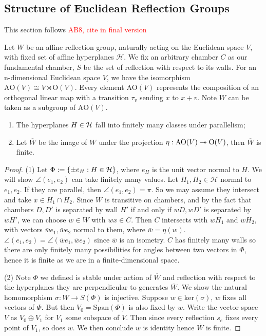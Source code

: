 \documentclass[../main.tex]{subfiles}
\begin{document}
\subsection{Structure of Euclidean Reflection Groups}

This section follows \textcolor{red}{AB8, cite in final version}

Let $W$ be an affine reflection group, naturally acting on the Euclidean space $V$, with fixed set of affine hyperplanes $\mathcal H$. We fix an arbitrary chamber $C$ as our fundamental chamber, $S$ be the set of reflection with respect to its walls. For an n-dimensional Euclidean space $V$, we have the isomorphism $\text{AO}(V) \cong V \rtimes \text{O}(V)$. Every element $\text{AO}(V)$ represents the composition of an orthogonal linear map with a transition $\tau_v$ sending $x$ to $x+v$. Note $W$ can be taken as a subgroup of $\text{AO}(V)$.

\begin{theorem}\label{thm:finpara}
    \begin{enumerate}
        \item The hyperplanes $H\in \mathcal{H}$ fall into finitely many classes under parallelism;
        \item Let $\overline W$ be the image of $W$ under the projection $\eta: \text{AO}(V) \twoheadrightarrow \text O (V)$, then $\overline W$ is finite.
    \end{enumerate}
\end{theorem}

\begin{proof}
    (1) Let $\Phi := \{\pm e_H:H\in \mathcal{H}\}$, where $e_H$ is the unit vector normal to $H$. We will show $\angle(e_1,e_2)$ can take finitely many values. Let $H_1,H_2 \in \mathcal H$ normal to $e_1,e_2$. If they are parallel, then $\angle(e_1,e_2)=\pi$. So we may assume they intersect and take $x\in H_1\cap H_2$. Since $W$ is transitive on chambers, and by the fact that chambers $D,D'$ is separated by wall $H'$ if and only if $wD,wD'$ is separated by $wH'$, we can choose $w \in W$ with $wx\in \overline C$. Then $\overline C$ intersects with $wH_1$ and $wH_2$, with vectors $\bar we_1,\bar we_2$ normal to them, where $\bar w=\eta(w)$. $\angle(e_1,e_2)=\angle(\bar we_1,\bar we_2)$ since $\bar w$ is an isometry. $C$ has finitely many walls so there are only finitely many possibilities for angles between two vectors in $\Phi$, hence it is finite as we are in a finite-dimensional space.

    (2) Note $\Phi$ we defined is stable under action of $\overline W$ and reflection with respect to the hyperplanes they are perpendicular to generates $\overline W$. We show the natural homomorphism $\sigma:W \rightarrow S(\Phi)$ is injective. Suppose $w\in \text{ker}(\sigma)$, $w$ fixes all vectors of $\Phi$. But then $V_0=\text{Span}(\Phi)$ is also fixed by $w$. Write the vector space $V$ as $V_0\oplus V_1$ for $V_1$ some subspace of $V$. Then since every reflection $s_e$ fixes every point of $V_1$, so does $w$. We then conclude $w$ is identity hence $\overline W$ is finite.
\end{proof}
\end{document}
